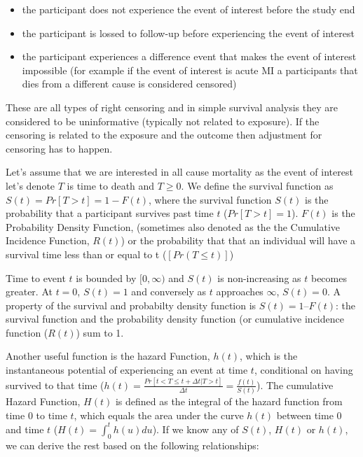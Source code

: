 \documentclass[
]{book}
\begin{document}
\begin{itemize}
\item the participant does not experience the event of interest before the study end
\item the participant is lossed to follow-up before experiencing the event of interest
\item the participant experiences a difference event that makes the event of interest impossible (for example if the event of interest is acute MI a participants that dies from a different cause is considered censored)
\end{itemize}

These are all types of right censoring and in simple survival analysis they are considered to be uninformative (typically not related to exposure). If the censoring is related to the exposure and the outcome then adjustment for censoring has to happen.

Let's assume that we are interested in all cause mortality as the event of interest let's denote \(T\) is time to death and \(T\geq 0\). We define the survival function as
\(S(t)=Pr[T>t]=1-F(t)\), where the survival function \(S(t)\) is the probability that a participant survives past time \(t\) (\(Pr[T>t]=1\)). \(F(t)\) is the Probability Density Function, (sometimes also denoted as the the Cumulative Incidence Function, \(R(t)\)) or the probability that that an individual will have a survival time less than or equal to t (\([Pr(T≤t)]\))

Time to event \(t\) is bounded by \([0,\infty)\) and \(S(t)\) is non-increasing as \(t\) becomes greater. At \(t=0\), \(S(t)=1\) and conversely as \(t\) approaches \(\infty\), \(S(t)=0\). A property of the survival and probabilty density function is \(S(t) = 1 – F(t)\): the survival function and the probability density function (or cumulative incidence function (\(R(t)\)) sum to 1.

Another useful function is the hazard Function, \(h(t)\), which is the instantaneous potential of experiencing an event at time \(t\), conditional on having survived to that time (\(h(t)=\frac{Pr[t<T\leq t+\Delta t|T>t]}{\Delta t}=\frac{f(t)}{S(t)}\)). The cumulative Hazard Function, \(H(t)\) is defined as the integral of the hazard function from time \(0\) to time \(t\), which equals the area under the curve \(h(t)\) between time \(0\) and time \(t\) (\(H(t)=\int_{0}^{t}h(u)du\)).
If we know any of \(S(t)\), \(H(t)\) or \(h(t)\), we can derive the rest based on the following relationships:
\end{document}

